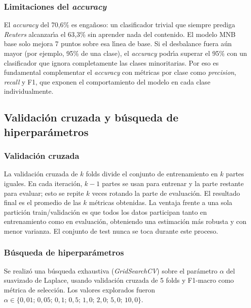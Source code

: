 \documentclass[11pt,a4paper]{article}
\begin{document}
\subsubsection*{Limitaciones del \textit{accuracy}}

El \textit{accuracy} del 70,6\% es enga\~{n}oso: un clasificador trivial que siempre prediga \textit{Reuters} alcanzar\'{\i}a el 63,3\% sin aprender nada del contenido. El modelo MNB base solo mejora 7 puntos sobre esa l\'{\i}nea de base. Si el desbalance fuera a\'{u}n mayor (por ejemplo, 95\% de una clase), el \textit{accuracy} podr\'{\i}a superar el 95\% con un clasificador que ignora completamente las clases minoritarias. Por eso es fundamental complementar el \textit{accuracy} con m\'{e}tricas por clase como \textit{precision}, \textit{recall} y F1, que exponen el comportamiento del modelo en cada clase individualmente.

\subsection{Validaci\'{o}n cruzada y b\'{u}squeda de hiperpar\'{a}metros}

\subsubsection*{Validaci\'{o}n cruzada}

La validaci\'{o}n cruzada de $k$ folds divide el conjunto de entrenamiento en $k$ partes iguales. En cada iteraci\'{o}n, $k-1$ partes se usan para entrenar y la parte restante para evaluar; esto se repite $k$ veces rotando la parte de evaluaci\'{o}n. El resultado final es el promedio de las $k$ m\'{e}tricas obtenidas. La ventaja frente a una sola partici\'{o}n train/validaci\'{o}n es que todos los datos participan tanto en entrenamiento como en evaluaci\'{o}n, obteniendo una estimaci\'{o}n m\'{a}s robusta y con menor varianza. El conjunto de test nunca se toca durante este proceso.

\subsubsection*{B\'{u}squeda de hiperpar\'{a}metros}

Se realiz\'{o} una b\'{u}squeda exhaustiva (\textit{GridSearchCV}) sobre el par\'{a}metro $\alpha$ del suavizado de Laplace, usando validaci\'{o}n cruzada de 5 folds y F1-macro como m\'{e}trica de selecci\'{o}n. Los valores explorados fueron $\alpha \in \{0{,}01;\, 0{,}05;\, 0{,}1;\, 0{,}5;\, 1{,}0;\, 2{,}0;\, 5{,}0;\, 10{,}0\}$.
\end{document}

